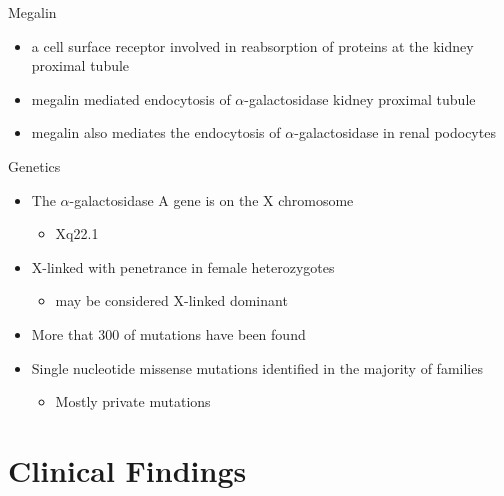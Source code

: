 \documentclass[presentation, smaller]{beamer}
\begin{document}
\begin{frame}[label={sec:orgheadline7}]{Megalin}
\begin{itemize}
\item a cell surface receptor involved in reabsorption of proteins at the kidney proximal tubule
\item megalin mediated endocytosis of \(\alpha\)-galactosidase kidney proximal tubule
\item megalin also mediates the endocytosis of \(\alpha\)-galactosidase in renal podocytes
\end{itemize}
\end{frame}

\begin{frame}[label={sec:orgheadline8}]{Genetics}
\begin{itemize}
\item The \(\alpha\)-galactosidase A gene is on the X chromosome
\begin{itemize}
\item Xq22.1
\end{itemize}
\item X-linked with penetrance in female heterozygotes
\begin{itemize}
\item may be considered X-linked dominant
\end{itemize}
\item More that 300 of mutations have been found
\item Single nucleotide missense mutations identified in the majority of families
\begin{itemize}
\item Mostly private mutations
\end{itemize}
\end{itemize}
\end{frame}

\section{Clinical Findings}
\label{sec:orgheadline11}
\end{document}
